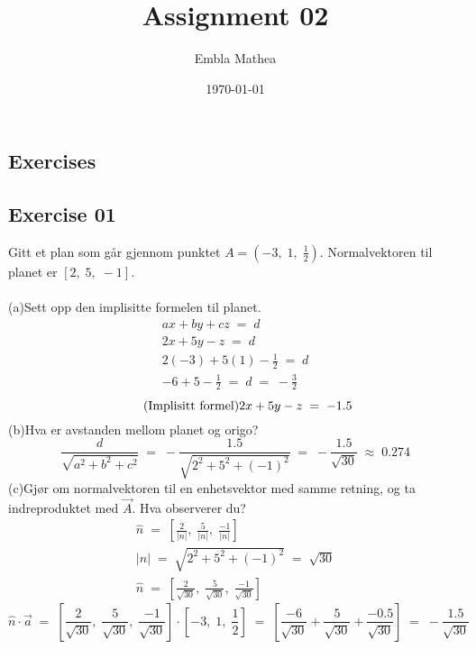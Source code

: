 \documentclass[12pt, a4paper]{article}
\title{Assignment 02}
\author{Embla Mathea}
\date{\today}
\begin{document}
\maketitle

\begin{center}
	\section*{Exercises}
\end{center}

\subsection*{Exercise 01}
Gitt et plan som går gjennom punktet
$A=\left(-3,\;1,\;\frac{1}{2}\right)$.
Normalvektoren til planet er $\left[2,\;5,\;-1\right]$.\\\\		
	(a)\quad Sett opp den implisitte formelen til planet.
			\begin{gather}
				\tag*{}
					ax+by+cz\;=\;d\\
				\tag*{}
					2x+5y-z\;=\;d\\
				\tag*{}
					2(-3)+5(1)-\frac{1}{2}\;=\;d\\
				\tag*{}
					-6+5-\frac{1}{2}\;=\;d\;=\;-\frac{3}{2}
			\end{gather}
			\begin{equation}
				\tag{Implisitt formel}
					2x+5y-z\;=\;-1.5\\
			\end{equation}
	(b)\quad Hva er avstanden mellom planet og origo?
			\begin{equation}
				\tag*{}
					\frac{d}{\sqrt{a^2+b^2+c^2}}\;=\;
					-\frac{1.5}{\sqrt{2^2+5^2+(-1)^2}}\;=\;
					-\frac{1.5}{\sqrt{30}}\;\approx\;0.274					
			\end{equation}
	(c)\quad Gjør om normalvektoren til en enhetsvektor
	med samme retning, og ta indreproduktet med
	$\vec{A}$. Hva observerer du?
			\begin{gather}
				\tag*{}
					\hat{n}\;=\;\left[
						\frac{2}{\left|n\right|},\;
						\frac{5}{\left|n\right|},\;
						\frac{-1}{\left|n\right|}
					\right]\\
				\tag*{}
						\left|n\right|\;=\;\sqrt{2^2+5^2+(-1)^2}
						\;=\;\sqrt{30}\\
				\tag*{}
					\hat{n}\;=\;\left[
						\frac{2}{\sqrt{30}},\;
						\frac{5}{\sqrt{30}},\;
						\frac{-1}{\sqrt{30}}
					\right]
				\end{gather}
			\begin{equation}
				\tag*{}
					\hat{n}\cdot\vec{a}\;=\;
					\left[
						\frac{2}{\sqrt{30}},\;
						\frac{5}{\sqrt{30}},\;
						\frac{-1}{\sqrt{30}}
					\right]\cdot
					\left[
						-3,\;1,\;\frac{1}{2}
					\right]\;=\;
					\left[
						\frac{-6}{\sqrt{30}}+
						\frac{5}{\sqrt{30}}+
						\frac{-0.5}{\sqrt{30}}
					\right]\;=\;-\frac{1.5}{\sqrt{30}}
			\end{equation}
			
\end{document}
